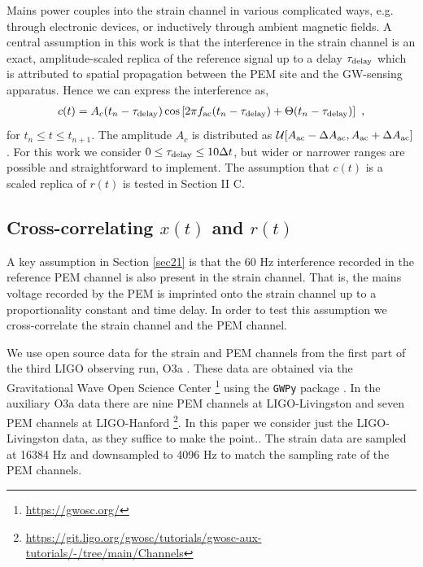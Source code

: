 \documentclass[pra,superscriptaddress,reprint,amsmath,amssymb,nofootinbib]{revtex4-2}
\begin{document}
Mains power couples into the strain channel in various complicated ways, e.g. through electronic devices, or inductively through ambient magnetic fields. A central assumption in this work is that the interference in the strain channel is an exact, amplitude-scaled replica of the reference signal up to a delay $\tau_{\rm delay}$ which is attributed to spatial propagation between the PEM site and the GW-sensing apparatus. Hence we can express the interference as, 
 \begin{eqnarray}
	c(t) = A_c(t_n - \tau_{\rm delay}) \cos \left[ 2 \pi f_{\rm ac} (t_n - \tau_{\rm delay}) + \Theta(t_n - \tau_{\rm delay}	)\right] \ ,
	\label{eq:vclutter}
\end{eqnarray}
for $t_n \leq t \leq t_{n+1}$. The amplitude $A_c$ is distributed as $\mathcal{U}[A_{\rm ac}- \Delta A_{\rm ac} ,A_{\rm ac} + \Delta A_{\rm ac} ]$. For this work we consider $0 \leq \tau_{\rm delay} \leq 10 \Delta t$, but wider or narrower ranges are possible and straightforward to implement. The assumption that $c(t)$ is a scaled replica of $r(t)$ is tested in Section II C.




\subsection{Cross-correlating $x(t)$ and $r(t)$}  \label{sec23}
A key assumption in Section \ref{sec21} is that the 60 Hz interference recorded in the reference PEM channel is also present in the strain channel. That is, the mains voltage recorded by the PEM is imprinted onto the strain channel up to a proportionality constant and time delay. In order to test this assumption we cross-correlate the strain channel and the PEM channel. \newline 

We use open source data for the strain and PEM channels from the first part of the third LIGO observing run, O3a \cite{LIGO_O3}. These data are obtained via the Gravitational Wave
Open Science Center \footnote{\url{https://gwosc.org/}} using the \texttt{GWPy} package \cite{gwpy}. In the auxiliary O3a data there are nine PEM channels at LIGO-Livingston and seven PEM channels at LIGO-Hanford \footnote{\url{https://git.ligo.org/gwosc/tutorials/gwosc-aux-tutorials/-/tree/main/Channels}}. In this paper we consider just the LIGO-Livingston data, as they suffice to make the point.. The strain data are sampled at 16384 Hz and downsampled to 4096 Hz to match the sampling rate of the PEM channels. \newline 
\end{document}
